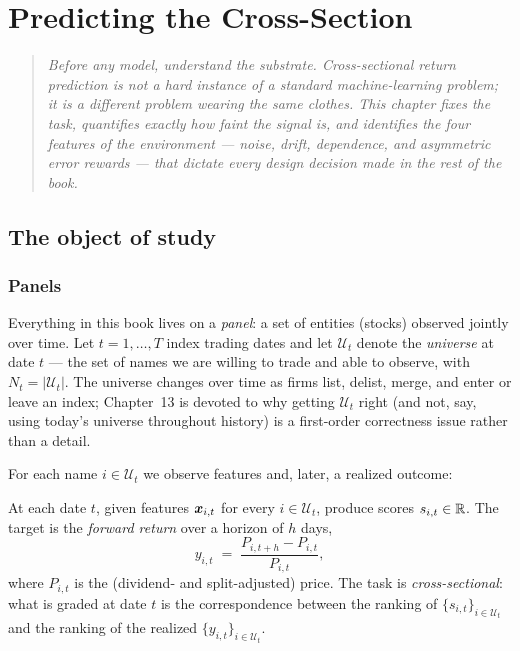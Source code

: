 \chapter{Predicting the Cross-Section}\label{ch:cross}

\begin{quote}\small\itshape
Before any model, understand the substrate. Cross-sectional return prediction
is not a hard instance of a standard machine-learning problem; it is a
different problem wearing the same clothes. This chapter fixes the task,
quantifies exactly how faint the signal is, and identifies the four features
of the environment --- noise, drift, dependence, and asymmetric error rewards
--- that dictate every design decision made in the rest of the book.
\end{quote}

\section{The object of study}\label{sec:object}

\subsection{Panels}

Everything in this book lives on a \emph{panel}: a set of entities (stocks)
observed jointly over time. Let $t = 1, \dots, T$ index trading dates and let
$\mathcal{U}_t$ denote the \emph{universe} at date $t$ --- the set of names we
are willing to trade and able to observe, with $N_t = |\mathcal{U}_t|$. The
universe changes over time as firms list, delist, merge, and enter or leave
an index; Chapter~13 is devoted to why getting $\mathcal{U}_t$ right (and not,
say, using today's universe throughout history) is a first-order correctness
issue rather than a detail.

For each name $i \in \mathcal{U}_t$ we observe features and, later, a
realized outcome:

\begin{definition}\label{def:task}
At each date $t$, given features $\bm{x}_{i,t}$ for every $i \in \mathcal{U}_t$,
produce scores $s_{i,t} \in \mathbb{R}$. The target is the \emph{forward return} over
a horizon of $h$ days,
\[
  y_{i,t} \;=\; \frac{P_{i,t+h} - P_{i,t}}{P_{i,t}},
\]
where $P_{i,t}$ is the (dividend- and split-adjusted) price. The task is
\emph{cross-sectional}: what is graded at date $t$ is the correspondence
between the ranking of $\{s_{i,t}\}_{i \in \mathcal{U}_t}$ and the ranking of
the realized $\{y_{i,t}\}_{i \in \mathcal{U}_t}$.
\end{definition}

